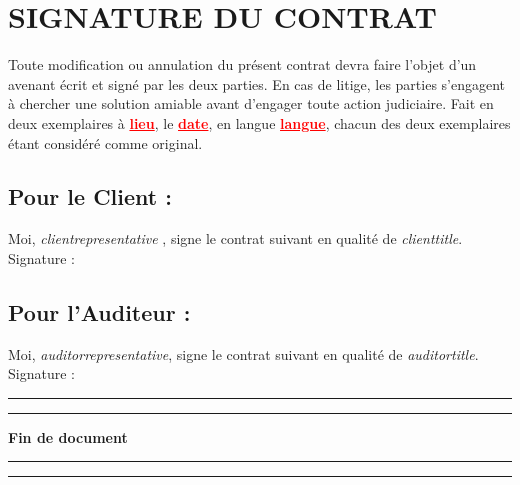 \documentclass[12pt]{extarticle}
\begin{document}
\section{SIGNATURE DU CONTRAT}
Toute modification ou annulation du présent contrat devra faire l'objet d'un avenant écrit et signé par les deux parties. En cas de litige, les parties s'engagent à chercher une solution amiable avant d'engager toute action judiciaire.
Fait en deux exemplaires à \textcolor{red}{\textbf{\underline{lieu}}}, le \textcolor{red}{\textbf{\underline{date}}}, en langue \textcolor{red}{\textbf{\underline{langue}}}, chacun des deux exemplaires étant considéré comme original.
\subsection{Pour le Client :}
Moi, \textit{ {{clientrepresentative}} }, signe le contrat suivant en qualité de \textit{ {{clienttitle}}}.
\vspace{3cm}
Signature :
\subsection{Pour l'Auditeur :}
Moi, \textit{ {{auditorrepresentative}}}, signe le contrat suivant en qualité de \textit{ {{auditortitle}}}.
\vspace{3cm}
Signature :
\noindent\rule{\textwidth}{0.4pt}
\vspace{1cm}
\noindent\rule{\textwidth}{0.4pt}
\begin{center}
    \Huge\textbf{Fin de document}
\end{center}
\vspace{1cm}
\noindent\rule{\textwidth}{0.4pt}
\vspace{1cm}
\noindent\rule{\textwidth}{0.4pt}
\end{document}
